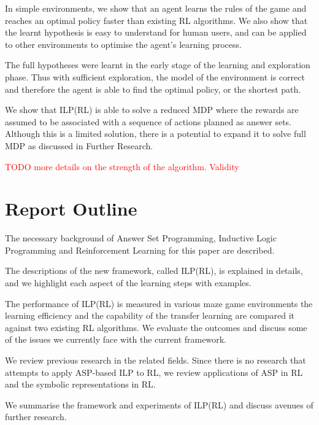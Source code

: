 In simple environments, we show that an agent learns the rules of the game and reaches an optimal policy faster than existing RL algorithms.
We also show that the learnt hypothesis is easy to understand for human users, and can be applied to other environments to optimise the agent's learning process.

The full hypotheses were learnt in the early stage of the learning and exploration phase. Thus with sufficient exploration, the model of the environment is correct
and therefore the agent is able to find the optimal policy, or the shortest path. 

We show that ILP(RL) is able to solve a reduced MDP where the rewards are assumed to be associated with a sequence of actions planned as answer sets.
Although this is a limited solution, there is a potential to expand it to solve full MDP as discussed in Further Research. 

\textcolor{red}{TODO more details on the strength of the algorithm. Validity}

\section{Report Outline}
\begin{customthm}{2}
The necessary background of Answer Set Programming, Inductive Logic Programming and Reinforcement Learning for this paper are described.
\end{customthm}

\begin{customthm}{3}
The descriptions of the new framework, called ILP(RL), is explained in details, and we highlight each aspect of the learning steps with examples. 
\end{customthm}

\begin{customthm}{4}
The performance of ILP(RL) is measured in various maze game environments the learning efficiency and the capability of the transfer learning are compared it against two existing RL algorithms.
We evaluate the outcomes and discuss some of the issues we currently face with the current framework.
\end{customthm}

\begin{customthm}{5}
We review previous research in the related fields. Since there is no research that attempts to apply ASP-based ILP to RL, we review  
applications of ASP in RL and the symbolic representations in RL.  
\end{customthm}

\begin{customthm}{6}
We summarise the framework and experiments of ILP(RL) and discuss avenues of further research. 
\end{customthm}